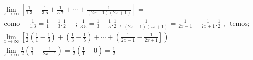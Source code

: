 \begin{ex}
\begin{align}
&\lim_{x\rightarrow \infty} \left[\frac{1}{1.3}+\frac{1}{3.5}+\frac{1}{5.7}+\cdots+\frac{1}{(2x-1)(2x+1)}\right]=\nonumber\\
&\text{ como }\quad\frac{1}{1.3}=\frac{1}{1}-\frac{1}{3}.\frac{1}{2}\quad\text{ ; }\frac{1}{3.5}=\frac{1}{3}-\frac{1}{5}.\frac{1}{2}\text{ , }\frac{1}{(2x-1)(2x+1)}=\frac{1}{2x-1}-\frac{1}{2x+1}.\frac{1}{2}\text{ , }\text{ temos; }\nonumber\\
&\lim_{x\rightarrow \infty} \left[\frac{1}{2}\left(\frac{1}{1}-\frac{1}{3}\right)+\left(\frac{1}{3}-\frac{1}{5}\right)+\cdots+\left(\frac{1}{2x-1}-\frac{1}{2x+1}\right]\right)=\nonumber\\
&\lim_{x\rightarrow \infty} \frac{1}{2}\left(\frac{1}{1}-\frac{1}{2x+1}\right)=\frac{1}{2}\left(\frac{1}{1}-0\right)=\frac{1}{2}\nonumber
\end{align}
\end{ex}